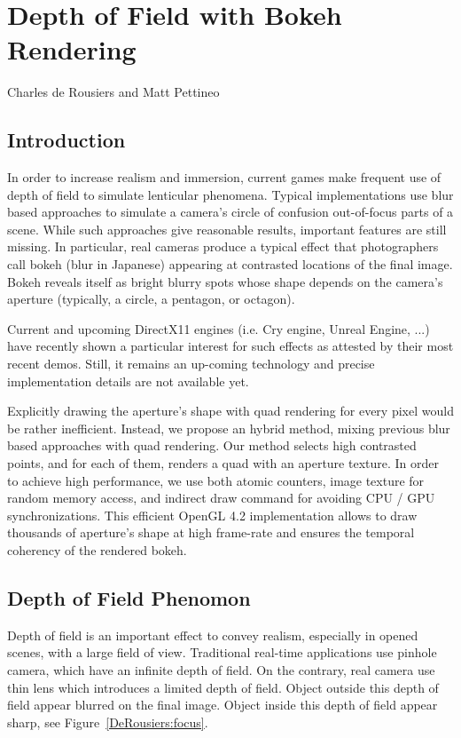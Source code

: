 \chapter{Depth of Field with Bokeh Rendering}{Charles de Rousiers and Matt Pettineo}
\label{BokehRendering}

\section{Introduction}

In order to increase realism and immersion, current games make frequent use of depth of field to simulate lenticular phenomena. Typical implementations use blur based approaches to simulate a camera’s circle of confusion out-of-focus parts of a scene. While such approaches give reasonable results, important features are still missing. In particular, real cameras produce a typical effect that photographers call bokeh (blur in Japanese) appearing at contrasted locations of the final image. Bokeh reveals itself as  bright blurry spots whose shape depends on the camera’s aperture (typically, a circle, a pentagon, or octagon). 

Current and upcoming DirectX11 engines (i.e. Cry engine, Unreal Engine, ...) have recently shown a particular interest for such effects as attested by their most recent demos. Still, it  remains an up-coming technology and precise implementation details are not available yet.

Explicitly drawing the aperture’s shape with quad rendering for every pixel would be rather inefficient. Instead, we propose an hybrid method, mixing previous blur based approaches with quad rendering. Our method selects high contrasted points, and for each of them, renders a quad with an aperture texture. In order to achieve high performance, we use both atomic counters, image texture for random memory access, and indirect draw command for avoiding CPU / GPU synchronizations. This efficient OpenGL 4.2 implementation allows to draw thousands of aperture’s shape at high frame-rate and ensures the temporal coherency of the rendered bokeh.

\section{Depth of Field Phenomon}\label{Derousiers:DOFPhenomenon}
Depth of field is an important effect to convey realism, especially in opened scenes, with a large field of view. Traditional real-time applications use pinhole camera, which have an infinite depth of field. On the contrary, real camera use thin lens which introduces a limited depth of field. Object outside this depth of field appear blurred on the final image. Object inside this depth of field appear sharp, see Figure~\ref{DeRousiers:focus}.


